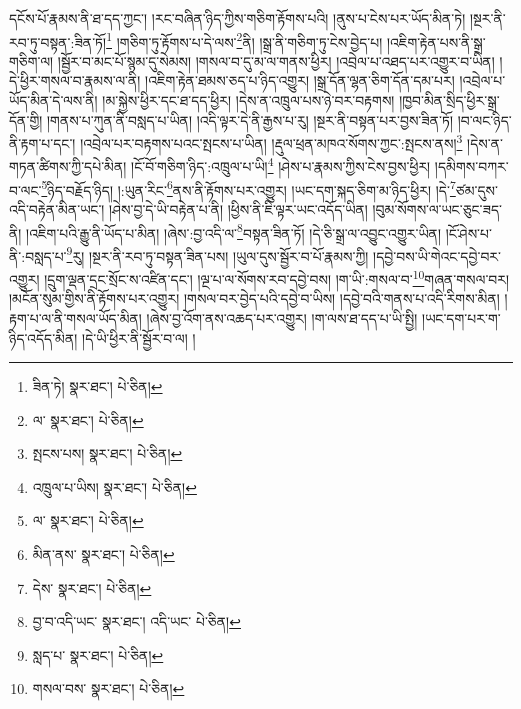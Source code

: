 དངོས་པོ་རྣམས་ནི་ཐ་དད་ཀྱང་། །རང་བཞིན་ཉིད་ཀྱིས་གཅིག་རྟོགས་པའི། །ནུས་པ་ངེས་པར་ཡོད་མིན་ཏེ། །སྔར་ནི་རབ་ཏུ་བསྟན་:ཟིན་ཏོ།\footnote{ཟིན་ཏེ།  སྣར་ཐང་།  པེ་ཅིན། } །གཅིག་ཏུ་རྟོགས་པ་དེ་ལས་\footnote{ལ་  སྣར་ཐང་།  པེ་ཅིན། }ནི། །སྒྲ་ནི་གཅིག་ཏུ་ངེས་བྱེད་པ། །འཇིག་རྟེན་པས་ནི་སྒྲ་གཅིག་ལ། །སྦྱོར་བ་མང་པོ་སྙམ་དུ་སེམས། །གསལ་བ་དུ་མ་ལ་གནས་ཕྱིར། །འབྲེལ་པ་འཐད་པར་འགྱུར་བ་ཡིན། །དེ་ཕྱིར་གསལ་བ་རྣམས་ལ་ནི། །འཇིག་རྟེན་ཐམས་ཅད་པ་ཉིད་འགྱུར། །སྒྲ་དོན་ལྷན་ཅིག་དོན་དམ་པར། །འབྲེལ་པ་ཡོད་མིན་དེ་ལས་ནི། །མ་སྐྱེས་ཕྱིར་དང་ཐ་དད་ཕྱིར། །དེས་ན་འཁྲུལ་པས་ཉེ་བར་བརྟགས། །ཁྱབ་མིན་སྲིད་ཕྱིར་སྒྲ་དོན་གྱི། །གནས་པ་ཀུན་ནི་བསླད་པ་ཡིན། །འདི་ལྟར་དེ་ནི་རྒྱས་པ་རུ། །སྔར་ནི་བསྟན་པར་བྱས་ཟིན་ཏོ། །བ་ལང་ཉིད་ནི་རྟག་པ་དང་། །འབྲེལ་པར་བརྟགས་པའང་སྤངས་པ་ཡིན། །རྡུལ་ཕྲན་མཁའ་སོགས་ཀྱང་:སྤངས་ནས།\footnote{སྤངས་པས།  སྣར་ཐང་།  པེ་ཅིན། } །དེས་ན་གཏན་ཚིགས་ཀྱི་དཔེ་མིན། །ངོ་བོ་གཅིག་ཉིད་:འཁྲུལ་པ་ཡི།\footnote{འཁྲུལ་པ་ཡིས།  སྣར་ཐང་།  པེ་ཅིན། } །ཤེས་པ་རྣམས་ཀྱིས་ངེས་བྱས་ཕྱིར། །དམིགས་བཀར་བ་ལང་\footnote{ལ་  སྣར་ཐང་།  པེ་ཅིན། }ཉིད་བརྗོད་ཉིད། །:ཡུན་རིང་\footnote{མིན་ནས་  སྣར་ཐང་།  པེ་ཅིན། }ནས་ནི་རྟོགས་པར་འགྱུར། །ཡང་དག་སྐད་ཅིག་མ་ཉིད་ཕྱིར། །དེ་\footnote{དེས་  སྣར་ཐང་།  པེ་ཅིན། }ཙམ་དུས་འདི་བརྟེན་མིན་ཡང་། །ཤེས་བྱ་དེ་ཡི་བརྟེན་པ་ནི། །ཕྱིས་ནི་ཇི་ལྟར་ཡང་འདོད་ཡིན། །བུམ་སོགས་ལ་ཡང་ཅུང་ཟད་ནི། །འཇིག་པའི་རྒྱུ་ནི་ཡོད་པ་མིན། །ཞེས་:བྱ་འདི་ལ་\footnote{བྱ་བ་འདི་ཡང་  སྣར་ཐང་། འདི་ཡང་  པེ་ཅིན། }བསྟན་ཟིན་ཏོ། །དེ་ཅི་སྒྲ་ལ་འབྱུང་འགྱུར་ཡིན། །ངོ་ཤེས་པ་ནི་:བསླད་པ་\footnote{སླད་པ་  སྣར་ཐང་།  པེ་ཅིན། }རུ། །སྔར་ནི་རབ་ཏུ་བསྟན་ཟིན་པས། །ཡུལ་དུས་སྦྱོར་བ་པོ་རྣམས་ཀྱི། །དབྱེ་བས་ཡི་གེའང་དབྱེ་བར་འགྱུར། །དྲུག་ལྡན་དྲང་སྲོང་ས་འཛིན་དང་། །ལྔ་པ་ལ་སོགས་རབ་དབྱེ་བས། །ག་ཡི་:གསལ་བ་\footnote{གསལ་བས་  སྣར་ཐང་།  པེ་ཅིན། }གཞན་གསལ་བར། །མངོན་སུམ་གྱིས་ནི་རྟོགས་པར་འགྱུར། །གསལ་བར་བྱེད་པའི་དབྱེ་བ་ཡིས། །དབྱེ་བའི་གནས་པ་འདི་རིགས་མིན། །རྟག་པ་ལ་ནི་གསལ་ཡོད་མིན། །ཞེས་བྱ་འོག་ནས་འཆད་པར་འགྱུར། །ག་ལས་ཐ་དད་པ་ཡི་སྤྱི། །ཡང་དག་པར་ག་ཉིད་འདོད་མིན། །དེ་ཡི་ཕྱིར་ནི་སྦྱོར་བ་ལ། །

